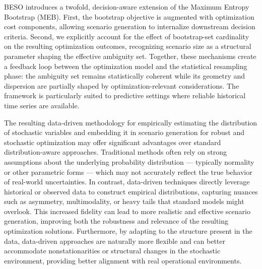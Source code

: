 \documentclass[review,a4paper,fleqn,3p,11pt,authoryear]{elsarticle}
\begin{document}
BESO introduces a twofold, decision-aware extension of the Maximum Entropy Bootstrap (MEB). First, the bootstrap objective is augmented with optimization cost components, allowing scenario generation to internalize downstream decision criteria. Second, we explicitly account for the effect of bootstrap-set cardinality on the resulting optimization outcomes, recognizing scenario size as a structural parameter shaping the effective ambiguity set. Together, these mechanisms create a feedback loop between the optimization model and the statistical resampling phase: the ambiguity set remains statistically coherent while its geometry and dispersion are partially shaped by optimization-relevant considerations. The framework is particularly suited to predictive settings where reliable historical time series are available.

The resulting data-driven methodology for empirically estimating the distribution of stochastic variables and embedding it in scenario generation for robust and stochastic optimization may offer significant advantages over standard distribution-aware approaches. Traditional methods often rely on strong assumptions about the underlying probability distribution — typically normality or other parametric forms — which may not accurately reflect the true behavior of real-world uncertainties. In contrast, data-driven techniques directly leverage historical or observed data to construct empirical distributions, capturing nuances such as asymmetry, multimodality, or heavy tails that standard models might overlook. This increased fidelity can lead to more realistic and effective scenario generation, improving both the robustness and relevance of the resulting optimization solutions. Furthermore, by adapting to the structure present in the data, data-driven approaches are naturally more flexible and can better accommodate nonstationarities or structural changes in the stochastic environment, providing better alignment with real operational environments.

\end{document}
